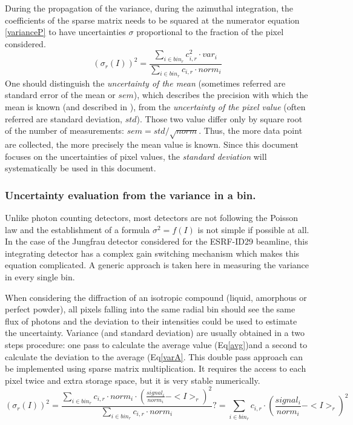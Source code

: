 \documentclass[preprint]{iucr}              %
\begin{document}
During the propagation of the variance, during the azimuthal integration, the coefficients of the sparse matrix needs to be squared at the numerator equation \ref{varianceP} to have uncertainties $\sigma$ proportional to the fraction of the pixel considered.
\begin{equation}
\label{varianceP}
(\sigma_{r}(I))^2 = \frac{\sum\limits_{i \in bin_r} c_{i,r}^2 \cdot var_i}
                  {\sum\limits_{i \in bin_r} c_{i,r} \cdot norm_i} 
\end{equation}
One should distinguish the \textit{uncertainty of the mean} (sometimes referred are standard error of the mean or $sem$), 
which describes the precision with which the mean is known (and described in \cite{pyfai_2020}),
from the \textit{uncertainty of the pixel value} (often referred are standard deviation, $std$). 
Those two value differ only by square root of the number of measurements: $sem = std/\sqrt{norm}$.
Thus, the more data point are collected, the more precisely the mean value is known.
Since this document focuses on the uncertainties of pixel values, the \textit{standard deviation} will systematically be used in this document.  

\subsubsection{Uncertainty evaluation from the variance in a bin.}

Unlike photon counting detectors, most detectors are not following the Poisson law and the establishment of a formula $\sigma^2 = f(I)$ is not simple if possible at all. 
In the case of the Jungfrau detector considered for the ESRF-ID29 beamline, this integrating detector has a complex gain switching mechanism \cite{jungfrau_PSI} which makes this equation complicated.
A generic approach is taken here in measuring the variance in every single bin.

When considering the diffraction of an isotropic compound (liquid, amorphous or perfect powder), all pixels falling into the same radial bin should see the same flux of photons and the deviation to their intensities could be used to estimate the uncertainty.
Variance (and standard deviation) are usually obtained in a two steps procedure: one pass to calculate the average value (Eq\ref{avg})and a second to calculate the deviation to the average (Eq\ref{varA}. 
This double pass approach can be implemented using sparse matrix multiplication. It requires the access to each pixel twice and extra storage space, but it is very stable numerically.
\begin{equation}
\label{varA}
(\sigma_{r}(I))^2 = \frac{\sum\limits_{i \in bin_r} c_{i,r} \cdot norm_i \cdot (\frac{signal_i}{norm_i}-<I>_r)^2}
                         {\sum\limits_{i \in bin_r} c_{i,r} \cdot norm_i}  ?=  \sum\limits_{i \in bin_r} c_{i,r} \cdot  (\frac{signal_i}{norm_i}-<I>_r)^2
\end{equation}
\end{document}
